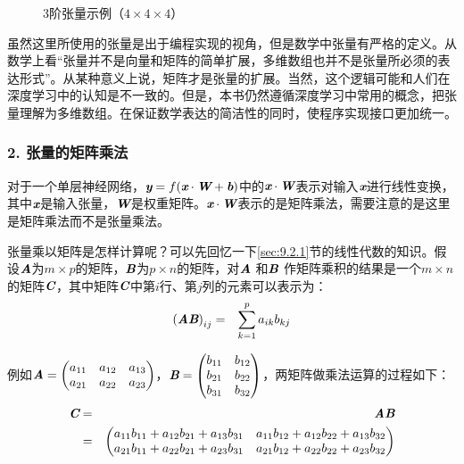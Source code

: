 \begin{figure}[htp]
\centering

\caption{3阶张量示例（$4 \times 4 \times 4$）}
\label{fig:9-25}
\end{figure}

\parinterval 虽然这里所使用的张量是出于编程实现的视角，但是数学中张量有严格的定义。从数学上看“张量并不是向量和矩阵的简单扩展，多维数组也并不是张量所必须的表达形式”。从某种意义上说，矩阵才是张量的扩展。当然，这个逻辑可能和人们在深度学习中的认知是不一致的。但是，本书仍然遵循深度学习中常用的概念，把张量理解为多维数组。在保证数学表达的简洁性的同时，使程序实现接口更加统一。


\subsubsection{2. 张量的矩阵乘法}

\parinterval 对于一个单层神经网络，$ {\textbf{\em y}}=f({\textbf{\em x}}\cdot{\textbf{\em W}}+{\textbf{\em b}}) $中的${\textbf{\em x}}\cdot {\textbf{\em W}} $表示对输入${\textbf{\em x}} $进行线性变换，其中${\textbf{\em x}}$是输入张量，$ {\textbf{\em W}}$是权重矩阵。$ {\textbf{\em x}}\cdot {\textbf{\em W}} $表示的是矩阵乘法，需要注意的是这里是矩阵乘法而不是张量乘法。

\parinterval 张量乘以矩阵是怎样计算呢？可以先回忆一下\ref{sec:9.2.1}节的线性代数的知识。假设$ {\textbf{\em A}} $为$ m\times p $的矩阵，$ {\textbf{\em B}} $为$ p\times n $的矩阵，对${\textbf{\em A}} $ 和${\textbf{\em B}}$ 作矩阵乘积的结果是一个$ m\times n $的矩阵${\textbf{\em C}}$，其中矩阵${\textbf{\em C}}$中第$ i $行、第$ j $列的元素可以表示为：
\begin{eqnarray}
{({\textbf{\em A}}{\textbf{\em B}})}_{ij}&=&\sum_{k=1}^{p}{a_{ik}b_{kj}}
\label{eq:9-24}
\end{eqnarray}

\noindent 例如$ {\textbf{\em A}}= \begin{pmatrix} a_{11} & a_{12} & a_{13}\\a_{21} & a_{22} & a_{23}\end{pmatrix} $，$ {\textbf{\em B}}= \begin{pmatrix} b_{11} & b_{12}\\b_{21} & b_{22}\\b_{31} & b_{32}\end{pmatrix} $，两矩阵做乘法运算的过程如下：
\begin{eqnarray}
{\textbf{\em C}} & = & {\textbf{\em A}}{\textbf{\em B}} \nonumber \\
                & = & \begin{pmatrix} a_{11}b_{11}+a_{12}b_{21}+a_{13}b_{31} & a_{11}b_{12}+a_{12}b_{22}+a_{13}b_{32}\\a_{21}b_{11}+a_{22}b_{21}+a_{23}b_{31} & a_{21}b_{12}+a_{22}b_{22}+a_{23}b_{32}\end{pmatrix}
\label{eq:9-108}
\end{eqnarray}

